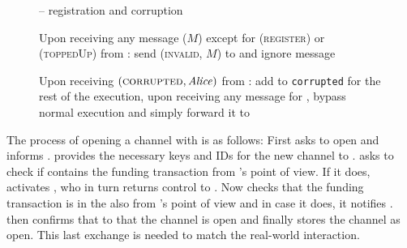 \begin{figure}[H]
\begin{systembox}{\fpaynet{} -- registration and corruption}
\begin{algorithmic}[1]
        \State Upon receiving any message ($M$) except for (\textsc{register})
        or (\textsc{toppedUp}) from \alice:
        \Indent
            \State send (\textsc{invalid}, $M$) to \alice{} and ignore message
          \EndIf
          \label{alg:fpaynet:support:unreg}
        \EndIndent
        \Statex

        \State Upon receiving $\left(\textsc{corrupted}, \mathit{Alice}\right)$ from
        \simulator:
        \Indent
          \State add \alice{} to \texttt{corrupted}
          \State for the rest of the execution, upon receiving any message for
          \alice{}, bypass normal execution and simply forward it to
          \simulator
        \EndIndent
      \end{algorithmic}
    \end{systembox}
    \caption{}
    \label{alg:fpaynet:support}
  \end{figure}

  The process of \alice{} opening a channel with \bob{} is as follows: First
  \alice{} asks \fpaynet{} to open and \fpaynet{} informs \simulator.
  \simulator{} provides the necessary keys and IDs for the new channel to
  \fpaynet. \alice{} asks \fpaynet{} to check if \ledger{} contains the funding
  transaction from \alice's point of view. If it does, \fpaynet{} activates
  \simulator, who in turn returns control to \fpaynet{}. Now \fpaynet{} checks
  that the funding transaction is in the \ledger{} also from \bob's point of
  view and in case it does, it notifies \simulator. \simulator{} then confirms
  that to \fpaynet{} that the channel is open and \fpaynet{} finally stores the
  channel as open. This last exchange is needed to match the real-world
  interaction.

